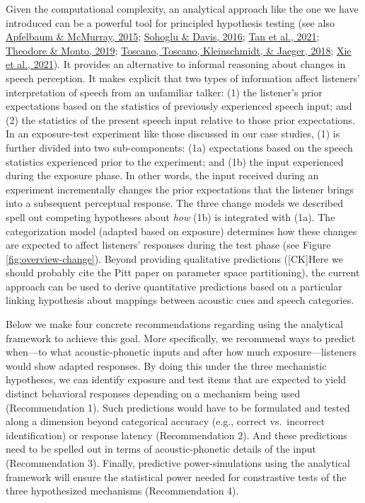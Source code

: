 \documentclass[
  11pt,
  english,
  man,floatsintext]{apa6}
\begin{document}
Given the computational complexity, an analytical approach like the one we have introduced can be a powerful tool for principled hypothesis testing (see also \protect\hyperlink{ref-apfelbaum-mcmurray2015}{Apfelbaum \& McMurray, 2015}; \protect\hyperlink{ref-sohoglu-davis2016}{Sohoglu \& Davis, 2016}; \protect\hyperlink{ref-tan2021}{Tan et al., 2021}; \protect\hyperlink{ref-theodore-monto2019}{Theodore \& Monto, 2019}; \protect\hyperlink{ref-toscano2018}{Toscano, Toscano, Kleinschmidt, \& Jaeger, 2018}; \protect\hyperlink{ref-xie2021cognition}{Xie et al., 2021}). It provides an alternative to informal reasoning about changes in speech perception. It makes explicit that two types of information affect listeners' interpretation of speech from an unfamiliar talker: (1) the listener's prior expectations based on the statistics of previously experienced speech input; and (2) the statistics of the present speech input relative to those prior expectations. In an exposure-test experiment like those discussed in our case studies, (1) is further divided into two sub-components: (1a) expectations based on the speech statistics experienced prior to the experiment; and (1b) the input experienced during the exposure phase. In other words, the input received during an experiment incrementally changes the prior expectations that the listener brings into a subsequent perceptual response. The three change models we described spell out competing hypotheses about \emph{how} (1b) is integrated with (1a). The categorization model (adapted based on exposure) determines how these changes are expected to affect listeners' responses during the test phase (see Figure \ref{fig:overview-change}). Beyond providing qualitative predictions ({[}CK{]}Here we should probably cite the Pitt paper on parameter space partitioning), the current approach can be used to derive quantitative predictions based on a particular linking hypothesis about mappings between acoustic cues and speech categories.

Below we make four concrete recommendations regarding using the analytical framework to achieve this goal. More specifically, we recommend ways to predict when---to what acoustic-phonetic inputs and after how much exposure---listeners would show adapted responses. By doing this under the three mechanistic hypotheses, we can identify exposure and test items that are expected to yield distinct behavioral responses depending on a mechanism being used (Recommendation 1). Such predictions would have to be formulated and tested along a dimension beyond categorical accuracy (e.g., correct vs.~incorrect identification) or response latency (Recommendation 2). And these predictions need to be spelled out in terms of acoustic-phonetic details of the input (Recommendation 3). Finally, predictive power-simulations using the analytical framework will ensure the statistical power needed for constrastive tests of the three hypothesized mechanisms (Recommendation 4).
\end{document}
